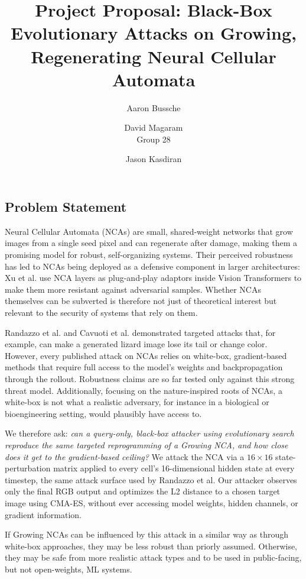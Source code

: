 \documentclass{article}
\title{Project Proposal: Black-Box Evolutionary Attacks on Growing, Regenerating Neural Cellular Automata}
\author{Aaron Bussche \and  David Magaram\\[0.3em] Group 28 \and Jason Kasdiran}
\begin{document}
	\maketitle



\subsection*{Problem Statement}

Neural Cellular Automata (NCAs) are small, shared-weight networks that grow images from a single seed pixel and can regenerate after damage, making them a promising model for robust, self-organizing systems. Their perceived robustness has led to NCAs being deployed as a defensive component in larger architectures: Xu et al. \cite{xu2024adanca} use NCA layers as plug-and-play adaptors inside Vision Transformers to make them more resistant against adversarial samples. Whether NCAs themselves can be subverted is therefore not just of theoretical interest but relevant to the security of systems that rely on them.

Randazzo et al. \cite{randazzo2021adversarial} and Cavuoti et al. \cite{cavuoti2022adversarial} demonstrated targeted attacks that, for example, can make a generated lizard image lose its tail or change color. However, every published attack on NCAs relies on white-box, gradient-based methods that require full access to the model's weights and backpropagation through the rollout. Robustness claims are so far tested only against this strong threat model. Additionally, focusing on the nature-inspired roots of NCAs, a white-box is not what a realistic adversary, for instance in a biological or bioengineering setting, would plausibly have access to.

We therefore ask: \textit{can a query-only, black-box attacker using evolutionary search reproduce the same targeted reprogramming of a Growing NCA, and how close does it get to the gradient-based ceiling?} We attack the NCA via a $16 \times 16$ state-perturbation matrix applied to every cell's 16-dimensional hidden state at every timestep, the same attack surface used by Randazzo et al. Our attacker observes only the final RGB output and optimizes the L2 distance to a chosen target image using CMA-ES, without ever accessing model weights, hidden channels, or gradient information.

If Growing NCAs can be influenced by this attack in a similar way as through white-box approaches, they may be less robust than priorly assumed. Otherwise, they may be safe from more realistic attack types and to be used in public-facing, but not open-weights, ML systems.  
\end{document}
